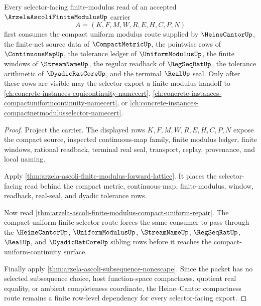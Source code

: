 \begin{theorem}
\label{thm:arzela-ascoli-finite-modulus-heine-cantor-compactness-route}
Every selector-facing finite-modulus read of an accepted $\ArzelaAscoliFiniteModulusUp$ carrier
$$
A=(K,F,M,W,R,E,H,C,P,N)
$$
first consumes the compact uniform modulus route supplied by $\HeineCantorUp$, the finite-net source data of $\CompactMetricUp$, the pointwise rows of $\ContinuousMapUp$, the tolerance ledger of $\UniformModulusUp$, the finite windows of $\StreamNameUp$, the regular readback of $\RegSeqRatUp$, the tolerance arithmetic of $\DyadicRatCoreUp$, and the terminal $\RealUp$ seal. Only after these rows are visible may the selector export a finite-modulus handoff to \autoref{ch:concrete-instances-equicontinuity-namecert}, \autoref{ch:concrete-instances-compactuniformcontinuity-namecert}, or \autoref{ch:concrete-instances-compactnetmodulusselector-namecert}.
\end{theorem}
\begin{proof}
Project the carrier. The displayed rows $K,F,M,W,R,E,H,C,P,N$ expose the compact source, inspected continuous-map family, finite modulus ledger, finite windows, rational readback, terminal real seal, transport, replay, provenance, and local naming.

Apply \autoref{thm:arzela-ascoli-finite-modulus-forward-lattice}. It places the selector-facing read behind the compact metric, continuous-map, finite-modulus, window, readback, real-seal, and dyadic tolerance rows.

Now read \autoref{thm:arzela-ascoli-finite-modulus-compact-uniform-repair}. The compact-uniform finite-selector route forces the same consumer to pass through the $\HeineCantorUp$, $\UniformModulusUp$, $\StreamNameUp$, $\RegSeqRatUp$, $\RealUp$, and $\DyadicRatCoreUp$ sibling rows before it reaches the compact-uniform-continuity surface.

Finally apply \autoref{thm:arzela-ascoli-subsequence-nonescape}. Since the packet has no selected subsequence choice, host function-space compactness, quotient real equality, or ambient completeness coordinate, the Heine--Cantor compactness route remains a finite row-level dependency for every selector-facing export.
\end{proof}

